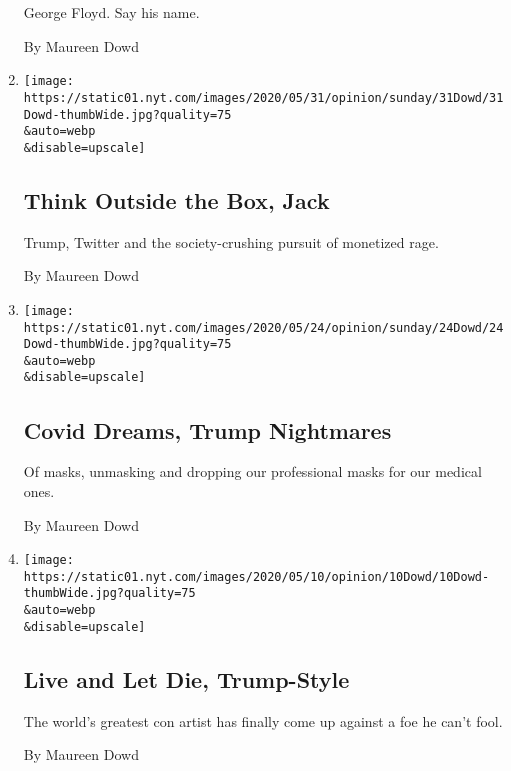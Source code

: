 \begin{enumerate}
  George Floyd. Say his name.

  By Maureen Dowd
\item
  \href{/2020/05/30/opinion/sunday/trump-twitter-jack-dorsey.html}{}

  \texttt{[image: https://static01.nyt.com/images/2020/05/31/opinion/sunday/31Dowd/31Dowd-thumbWide.jpg?quality=75\\\&auto=webp\\\&disable=upscale]}

  \hypertarget{think-outside-the-box-jack}{%
  \subsection{Think Outside the Box,
  Jack}\label{think-outside-the-box-jack}}

  Trump, Twitter and the society-crushing pursuit of monetized rage.

  By Maureen Dowd
\item
  \href{/2020/05/23/opinion/sunday/trump-mask-coronavirus.html}{}

  \texttt{[image: https://static01.nyt.com/images/2020/05/24/opinion/sunday/24Dowd/24Dowd-thumbWide.jpg?quality=75\\\&auto=webp\\\&disable=upscale]}

  \hypertarget{covid-dreams-trump-nightmares}{%
  \subsection{Covid Dreams, Trump
  Nightmares}\label{covid-dreams-trump-nightmares}}

  Of masks, unmasking and dropping our professional masks for our
  medical ones.

  By Maureen Dowd
\item
  \href{/2020/05/09/opinion/sunday/coronavirus-trump-vampires.html}{}

  \texttt{[image: https://static01.nyt.com/images/2020/05/10/opinion/10Dowd/10Dowd-thumbWide.jpg?quality=75\\\&auto=webp\\\&disable=upscale]}

  \hypertarget{live-and-let-die-trump-style}{%
  \subsection{Live and Let Die,
  Trump-Style}\label{live-and-let-die-trump-style}}

  The world's greatest con artist has finally come up against a foe he
  can't fool.

  By Maureen Dowd
\end{enumerate}

